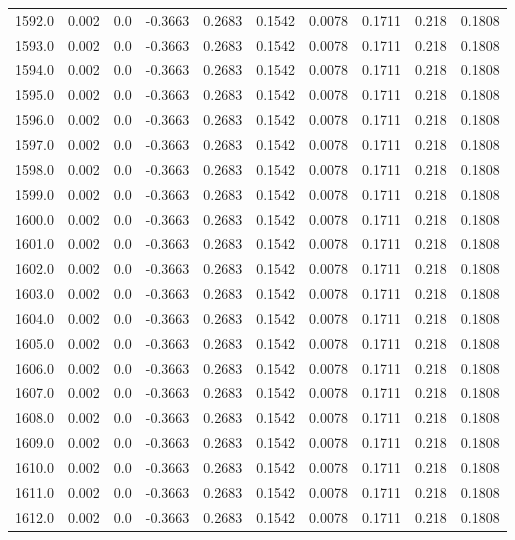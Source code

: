 \begin{longtable}{lrrrrrrrrr}
1592.0 & 0.002 & 0.0 & -0.3663 & 0.2683 & 0.1542 & 0.0078 & 0.1711 & 0.218 & 0.1808 \\
1593.0 & 0.002 & 0.0 & -0.3663 & 0.2683 & 0.1542 & 0.0078 & 0.1711 & 0.218 & 0.1808 \\
1594.0 & 0.002 & 0.0 & -0.3663 & 0.2683 & 0.1542 & 0.0078 & 0.1711 & 0.218 & 0.1808 \\
1595.0 & 0.002 & 0.0 & -0.3663 & 0.2683 & 0.1542 & 0.0078 & 0.1711 & 0.218 & 0.1808 \\
1596.0 & 0.002 & 0.0 & -0.3663 & 0.2683 & 0.1542 & 0.0078 & 0.1711 & 0.218 & 0.1808 \\
1597.0 & 0.002 & 0.0 & -0.3663 & 0.2683 & 0.1542 & 0.0078 & 0.1711 & 0.218 & 0.1808 \\
1598.0 & 0.002 & 0.0 & -0.3663 & 0.2683 & 0.1542 & 0.0078 & 0.1711 & 0.218 & 0.1808 \\
1599.0 & 0.002 & 0.0 & -0.3663 & 0.2683 & 0.1542 & 0.0078 & 0.1711 & 0.218 & 0.1808 \\
1600.0 & 0.002 & 0.0 & -0.3663 & 0.2683 & 0.1542 & 0.0078 & 0.1711 & 0.218 & 0.1808 \\
1601.0 & 0.002 & 0.0 & -0.3663 & 0.2683 & 0.1542 & 0.0078 & 0.1711 & 0.218 & 0.1808 \\
1602.0 & 0.002 & 0.0 & -0.3663 & 0.2683 & 0.1542 & 0.0078 & 0.1711 & 0.218 & 0.1808 \\
1603.0 & 0.002 & 0.0 & -0.3663 & 0.2683 & 0.1542 & 0.0078 & 0.1711 & 0.218 & 0.1808 \\
1604.0 & 0.002 & 0.0 & -0.3663 & 0.2683 & 0.1542 & 0.0078 & 0.1711 & 0.218 & 0.1808 \\
1605.0 & 0.002 & 0.0 & -0.3663 & 0.2683 & 0.1542 & 0.0078 & 0.1711 & 0.218 & 0.1808 \\
1606.0 & 0.002 & 0.0 & -0.3663 & 0.2683 & 0.1542 & 0.0078 & 0.1711 & 0.218 & 0.1808 \\
1607.0 & 0.002 & 0.0 & -0.3663 & 0.2683 & 0.1542 & 0.0078 & 0.1711 & 0.218 & 0.1808 \\
1608.0 & 0.002 & 0.0 & -0.3663 & 0.2683 & 0.1542 & 0.0078 & 0.1711 & 0.218 & 0.1808 \\
1609.0 & 0.002 & 0.0 & -0.3663 & 0.2683 & 0.1542 & 0.0078 & 0.1711 & 0.218 & 0.1808 \\
1610.0 & 0.002 & 0.0 & -0.3663 & 0.2683 & 0.1542 & 0.0078 & 0.1711 & 0.218 & 0.1808 \\
1611.0 & 0.002 & 0.0 & -0.3663 & 0.2683 & 0.1542 & 0.0078 & 0.1711 & 0.218 & 0.1808 \\
1612.0 & 0.002 & 0.0 & -0.3663 & 0.2683 & 0.1542 & 0.0078 & 0.1711 & 0.218 & 0.1808 \\

\end{longtable}
